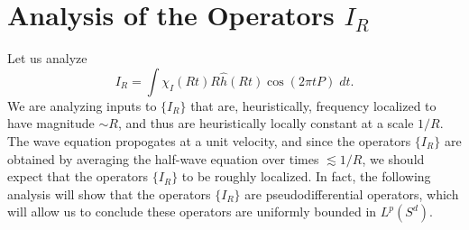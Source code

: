 
\section{Analysis of the Operators $I_R$}

Let us analyze
%
\[ I_R = \int \chi_I(Rt) R \widehat{h}(Rt) \cos(2 \pi t P)\; dt. \]
%
We are analyzing inputs to $\{ I_R \}$ that are, heuristically, frequency localized to have magnitude $\sim R$, and thus are heuristically locally constant at a scale $1/R$. The wave equation propogates at a unit velocity, and since the operators $\{ I_R \}$ are obtained by averaging the half-wave equation over times $\lesssim 1/R$, we should expect that the operators $\{ I_R \}$ to be roughly localized. In fact, the following analysis will show that the operators $\{ I_R \}$ are pseudodifferential operators, which will allow us to conclude these operators are uniformly bounded in $L^p(S^d)$.

